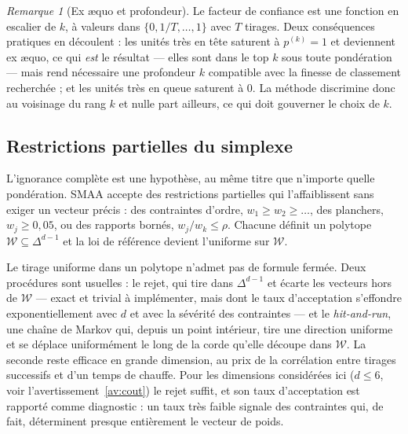 \documentclass[11pt,a4paper]{article}
\theoremstyle{definition}
\theoremstyle{remark}
\newtheorem{remarque}{Remarque}[section]
\newcommand{\simplex}{\Delta^{d-1}}
\begin{document}
\medskip

\begin{remarque}[Ex \ae quo et profondeur]
  \label{rem:smaa-exaequo}
  Le facteur de confiance est une fonction en escalier de $k$, à valeurs dans
  $\{0, 1/T, \dots, 1\}$ avec $T$ tirages. Deux conséquences pratiques en découlent :
  les unités très en tête saturent à $p^{(k)} = 1$ et deviennent ex \ae quo, ce qui
  \emph{est} le résultat --- elles sont dans le top $k$ sous toute pondération --- mais
  rend nécessaire une profondeur $k$ compatible avec la finesse de classement recherchée ;
  et les unités très en queue saturent à $0$. La méthode discrimine donc au voisinage du
  rang $k$ et nulle part ailleurs, ce qui doit gouverner le choix de $k$.
\end{remarque}

\bigskip

\subsection{Restrictions partielles du simplexe}
\label{sec:smaa-restrictions}

\medskip

L'ignorance complète est une hypothèse, au même titre que n'importe quelle pondération.
SMAA accepte des restrictions partielles \citep{lahdelma2001} qui l'affaiblissent sans
exiger un vecteur précis : des contraintes d'ordre, $w_1 \ge w_2 \ge \dots$, des planchers,
$w_j \ge 0{,}05$, ou des rapports bornés, $w_j / w_k \le \rho$. Chacune définit un
polytope $\mathcal{W} \subseteq \simplex$ et la loi de référence devient l'uniforme sur
$\mathcal{W}$.

\bigskip

Le tirage uniforme dans un polytope n'admet pas de formule fermée. Deux procédures sont
usuelles : le rejet, qui tire dans $\simplex$ et écarte les vecteurs hors de
$\mathcal{W}$ --- exact et trivial à implémenter, mais dont le taux d'acceptation
s'effondre exponentiellement avec $d$ et avec la sévérité des contraintes --- et le
\emph{hit-and-run}, une chaîne de Markov qui, depuis un point intérieur, tire une
direction uniforme et se déplace uniformément le long de la corde qu'elle découpe dans
$\mathcal{W}$. La seconde reste efficace en grande dimension, au prix de la corrélation
entre tirages successifs et d'un temps de chauffe. Pour les dimensions considérées ici
($d \le 6$, voir l'avertissement~\ref{av:cout}) le rejet suffit, et son taux
d'acceptation est rapporté comme diagnostic : un taux très faible signale des contraintes
qui, de fait, déterminent presque entièrement le vecteur de poids.
\end{document}
